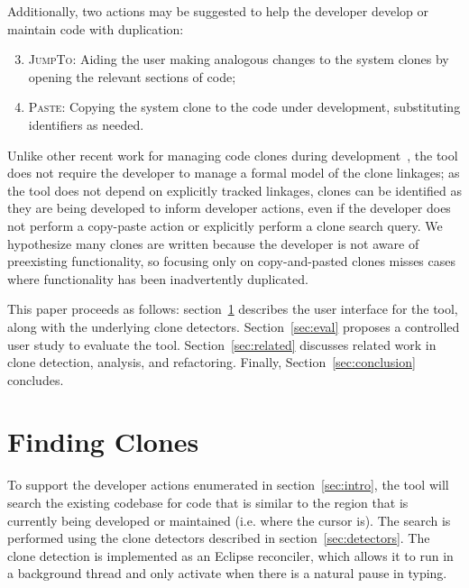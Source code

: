 \documentclass[nocopyrightspace,10pt]{sigplanconf}
\begin{document}
\noindent Additionally, two actions may be suggested to help the developer
develop or maintain code with duplication:

\begin{enumerate}
\setcounter{enumi}{2}
  \item \textsc{JumpTo}: Aiding the user making analogous changes to the system clones
    by opening the relevant sections of code; 
  \item \textsc{Paste}: Copying the system clone to the code under development,
    substituting identifiers as needed.
\end{enumerate}

Unlike other recent work for managing code clones during
development~\cite{deWit2009, Duala-Ekoko2007}, the tool does not
require the developer to manage a formal model of the clone linkages;
as the tool does not depend on explicitly tracked linkages, clones can
be identified as they are being developed to inform developer actions,
even if the developer does not perform a copy-paste action or
explicitly perform a clone search query.  We hypothesize many clones 
are written because the developer is not aware of preexisting functionality,
 so focusing only on copy-and-pasted clones
misses cases where functionality has been inadvertently 
duplicated.

This paper proceeds as follows: section~\ref{sec:finding-clones}
describes the user interface for the tool, along with the underlying
clone detectors. Section~\ref{sec:eval} proposes a controlled user
study to evaluate the tool. Section~\ref{sec:related} discusses
related work in clone detection, analysis, and refactoring. Finally,
Section~\ref{sec:conclusion} concludes.

\section{Finding Clones}
\label{sec:finding-clones}



To support the developer actions enumerated in section~\ref{sec:intro},
the tool will search the existing codebase for code
that is similar to the region that is currently being developed or maintained
(i.e. where the cursor is). The search is performed using the clone detectors
described in section~\ref{sec:detectors}. The clone detection is implemented as
an Eclipse reconciler, which allows it to run in a background thread and only activate 
when there is a natural pause in typing.
\end{document}
